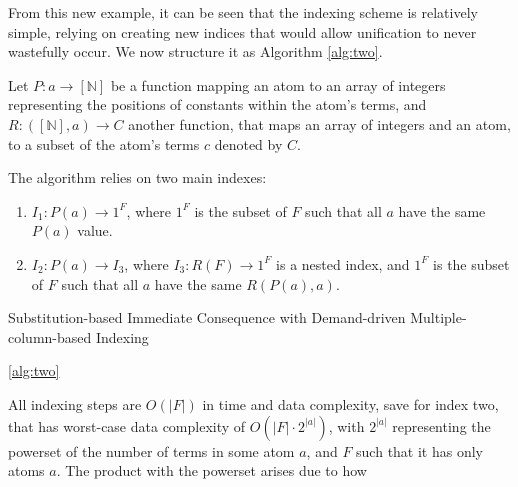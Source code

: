 \documentclass[sigconf,screen,review=false,natbib]{acmart}
\theoremstyle{definition}
\begin{document}
From this new example, it can be seen that the indexing scheme is relatively simple, relying on creating new indices that would allow unification
to never wastefully occur. We now structure it as Algorithm \ref{alg:two}.

Let $P : a \to [\mathbb{N}]$ be a function mapping an atom to an array of integers representing the positions of constants within the atom's
terms, and $R : ([\mathbb{N}], a) \to C$ another function, that maps an array of integers and an atom, to a subset of the atom's terms $c$ denoted by $C$.

The algorithm relies on two main indexes:
\begin{enumerate}
	\item $I_1 : P(a) \to 1^{F}$, where $1^{F}$ is the subset of
	      $F$ such that all $a$ have the same $P(a)$ value.
	\item $I_2 : P(a) \to I_3$, where $I_3 : R(F) \to 1^{F}$ is a nested index, and $1^{F}$ is the subset
	      of $F$ such that all $a$ have the same $R(P(a), a)$.
\end{enumerate}
\begin{algorithm}
	\SetAlgoLined
	\caption{Substitution-based Immediate Consequence with Demand-driven Multiple-column-based Indexing}
	\ref{alg:two}
\end{algorithm}
All indexing steps are $O(|F|)$ in time and data complexity, save for index two, that has worst-case data complexity of $O(|F| \cdot 2^{|a|})$, with $2^{|a|}$
representing the powerset of the number of terms in some atom $a$, and $F$ such that it has only atoms $a$. The product with the powerset arises due to how
\end{document}
